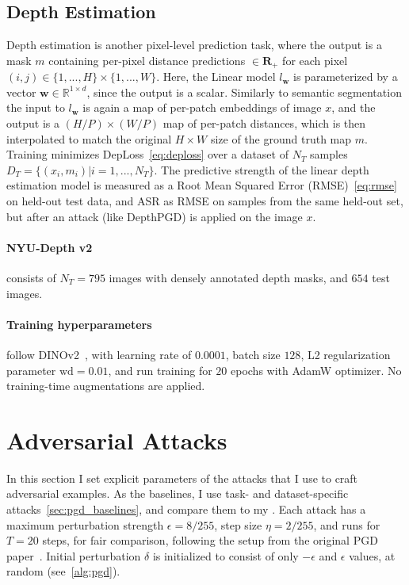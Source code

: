 \subsection{Depth Estimation}

Depth estimation is another pixel-level prediction task, where the output is a mask $m$ containing per-pixel distance predictions $\in\mathbf{R}_+$ for each pixel $(i,j)\in\{1,...,H\}\times\{1,...,W\}$. Here, the Linear model $l_\mathbf{w}$ is parameterized by a vector $\mathbf{w}\in\mathbb{R}^{1\times d}$, since the output is a scalar. Similarly to semantic segmentation the input to $l_\mathbf{w}$ is again a map of per-patch embeddings of image $x$, and the output is a $(H/P)\times(W/P)$ map of per-patch distances, which is then interpolated to match the original $H\times W$ size of the ground truth map $m$. Training minimizes DepLoss~\cref{eq:deploss} over a dataset of $N_T$ samples $D_T=\{(x_i,m_i)|i=1,...,N_T\}$. The predictive strength of the linear depth estimation model is measured as a Root Mean Squared Error (RMSE)~\cref{eq:rmse} on held-out test data, and ASR as RMSE on samples from the same held-out set, but after an attack (like DepthPGD) is applied on the image $x$.

\paragraph{NYU-Depth v2~\cite{nyudepth}} consists of $N_T=795$ images with densely annotated depth masks, and $654$ test images.

\paragraph{Training hyperparameters} follow DINOv2~\cite{dinov2}, with learning rate of $0.0001$, batch size $128$, L2 regularization parameter $\text{wd}=0.01$, and run training for $20$ epochs with AdamW optimizer. No training-time augmentations are applied.

\section{Adversarial Attacks}

In this section I set explicit parameters of the attacks that I use to craft adversarial examples. As the baselines, I use task- and dataset-specific attacks~\cref{sec:pgd_baselines}, and compare them to my \EmbedAttack. Each attack has a maximum perturbation strength $\epsilon=8/255$, step size $\eta=2/255$, and runs for $T=20$ steps, for fair comparison, following the setup from the original PGD paper~\cite{pgd}. Initial perturbation $\delta$ is initialized to consist of only $-\epsilon$ and $\epsilon$ values, at random (see~\cref{alg:pgd}).

